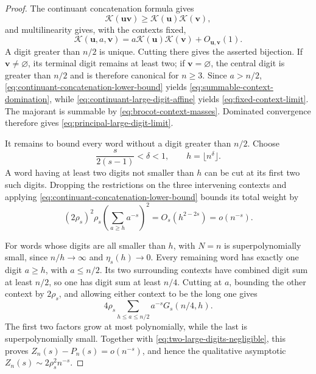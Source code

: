 \begin{proof}
The continuant concatenation formula gives
\begin{equation}
 \mathcal K(\mathbf u\mathbf v)
 \ge\mathcal K(\mathbf u)\mathcal K(\mathbf v),
 \label{eq:continuant-concatenation-lower-bound}
\end{equation}
and multilinearity gives, with the contexts fixed,
\begin{equation}
 \mathcal K(\mathbf u,a,\mathbf v)
 =a\mathcal K(\mathbf u)\mathcal K(\mathbf v)
  +O_{\mathbf u,\mathbf v}(1).
 \label{eq:continuant-large-digit-affine}
\end{equation}
A digit greater than \(n/2\) is unique.  Cutting there gives the asserted
bijection.  If \(\mathbf v\ne\varnothing\), its terminal digit remains at
least two; if \(\mathbf v=\varnothing\), the central digit is greater than
\(n/2\) and is therefore canonical for \(n\ge3\).  Since \(a>n/2\),
\eqref{eq:continuant-concatenation-lower-bound} yields
\eqref{eq:summable-context-domination}, while
\eqref{eq:continuant-large-digit-affine} yields
\eqref{eq:fixed-context-limit}.  The majorant is summable by
\eqref{eq:brocot-context-masses}.  Dominated convergence therefore gives
\eqref{eq:principal-large-digit-limit}.

It remains to bound every word without a digit greater than \(n/2\).  Choose
\[
 \frac{s}{2(s-1)}<\delta<1,
 \qquad h=\lfloor n^\delta\rfloor.
\]
A word having at least two digits not smaller than \(h\) can be cut at its
first two such digits.  Dropping the restrictions on the three intervening
contexts and applying \eqref{eq:continuant-concatenation-lower-bound} bounds
its total weight by
\begin{equation}
 (2\rho_s)^2\rho_s
 \left(\sum_{a\ge h}a^{-s}\right)^2
 =O_s(h^{2-2s})=o(n^{-s}).
 \label{eq:two-large-digits-negligible}
\end{equation}

For words whose digits are all smaller than \(h\),
 with \(N=n\) is
superpolynomially small, since \(n/h\to\infty\) and \(\eta_s(h)\to0\).
Every remaining word has exactly one digit \(a\ge h\), with \(a\le n/2\).
Its two surrounding contexts have combined digit sum at least \(n/2\), so
one has digit sum at least \(n/4\).  Cutting at \(a\), bounding the other
context by \(2\rho_s\), and allowing either context to be the long one gives
\[
 4\rho_s\sum_{h\le a\le n/2}a^{-s}G_s(n/4,h).
\]
 The first two factors grow at most polynomially, while the last is
 superpolynomially small.  Together with
 \eqref{eq:two-large-digits-negligible}, this proves
 \(Z_n(s)-P_n(s)=o(n^{-s})\), and hence the qualitative asymptotic
 \(Z_n(s)\sim2\rho_s^2n^{-s}\).


\end{proof}
